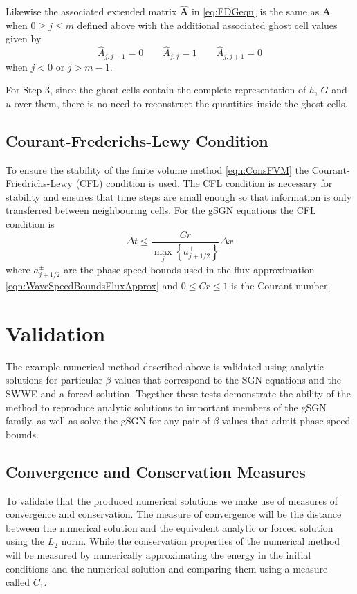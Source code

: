 \documentclass[10pt]{elsarticle}
\newcommand{\vecn}[1]{\boldsymbol{#1}}
\begin{document}
Likewise the associated extended matrix $\vecn{\hat{A}}$ in \eqref{eq:FDGeqn} is the same as $\vecn{A}$ when $0 \ge j \le m$ defined above with the additional associated ghost cell values given by
\begin{equation}
\hat{A}_{j,j-1} =  0  \quad \quad
\hat{A}_{j,j} = 1 \quad \quad
\hat{A}_{j,j+1} = 0
\end{equation}
when $j < 0$ or $j > m -1$. 

For Step 3, since the ghost cells contain the complete representation of $h$, $G$ and $u$ over them, there is no need to reconstruct the quantities inside the ghost cells. 


\subsection{Courant-Frederichs-Lewy Condition}
To ensure the stability of the finite volume method \eqref{eqn:ConsFVM} the Courant-Friedrichs-Lewy (CFL) condition \cite{Courant-etal-1967-215} is used. The CFL condition is necessary for stability and ensures that time steps are small enough so that information is only transferred between neighbouring cells. For the gSGN equations the CFL condition is 
\begin{equation}
\Delta t \le \frac{Cr }{\max_{j} \left\lbrace a^\pm_{j+1/2} \right\rbrace} \Delta x
\label{eqn:CFLcond}
\end{equation}
where $a^\pm_{j+1/2} $ are the phase speed bounds used in the flux approximation \eqref{eqn:WaveSpeedBoundsFluxApprox} and $0\le Cr \le 1$ is the Courant number. 

\section{Validation}
The example numerical method described above is validated using analytic solutions for particular $\beta$ values that correspond to the SGN equations and the SWWE and a forced solution. Together these tests demonstrate the ability of the method to reproduce analytic solutions to important members of the gSGN family, as well as solve the gSGN for any pair of $\beta$ values that admit phase speed bounds.

\subsection{Convergence and Conservation Measures}
To validate that the produced numerical solutions we make use of measures of convergence and conservation. The measure of convergence will be the distance between the numerical solution and the equivalent analytic or forced solution using the $L_2$ norm. While the conservation properties of the numerical method will be measured by numerically approximating the energy in the initial conditions and the numerical solution and comparing them using a measure called $C_1$.
\end{document}
